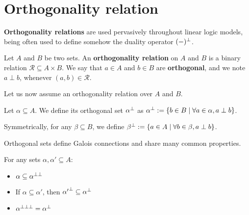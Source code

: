 \section{Orthogonality relation}\label{orthogonality-relation}

\textbf{Orthogonality relations} are used pervasively throughout linear
logic models, being often used to define somehow the duality operator
\((-)^\bot\).

\begin{definition}
Let $A$ and $B$ be two sets. An \textbf{orthogonality relation} on $A$ and $B$ is a binary relation $\mathcal{R}\subseteq A\times B$. We say that $a\in A$ and $b\in B$ are \textbf{orthogonal}, and we note $a\perp b$, whenever $(a, b)\in\mathcal{R}$.
\end{definition}

Let us now assume an orthogonality relation over \(A\) and \(B\).

\begin{definition}
Let $\alpha\subseteq A$. We define its orthogonal set $\alpha^\bot$ as $\alpha^\bot:=\{b\in B \mid \forall a\in \alpha, a\perp b\}$.

Symmetrically, for any $\beta\subseteq B$, we define $\beta^\bot:=\{a\in A \mid \forall b\in \beta, a\perp b\}$.
\end{definition}

Orthogonal sets define Galois connections and share many common
properties.

\begin{proposition}
For any sets $\alpha, \alpha'\subseteq A$:
\begin{itemize}
\item $\alpha\subseteq \alpha^{\bot\bot}$
\item If $\alpha\subseteq\alpha'$, then ${\alpha'}^\bot\subseteq\alpha^\bot$
\item $\alpha^{\bot\bot\bot} = \alpha^\bot$
\end{itemize}
\end{proposition}

